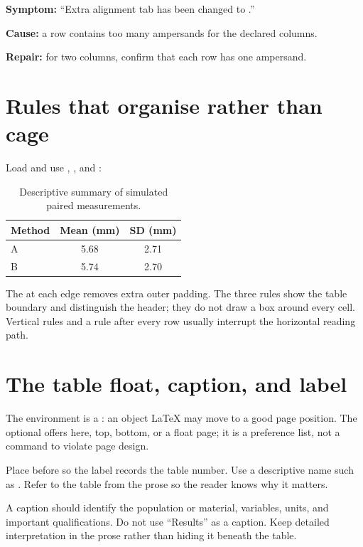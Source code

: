 \begin{commonerror}
\textbf{Symptom:} ``Extra alignment tab has been changed to .''

\textbf{Cause:} a row contains too many ampersands for the declared columns.

\textbf{Repair:} for two columns, confirm that each row has one ampersand.
\end{commonerror}

\section{Rules that organise rather than cage}

Load  and use , , and :

\begin{table}[htbp]
  \centering
  \caption{Descriptive summary of simulated paired measurements.}
  \label{tab:descriptive-summary}
  \begin{tabular}{@{}lSS@{}}
    \toprule
    {Method} & {Mean (mm)} & {SD (mm)} \\
    \midrule
    A & 5.68 & 2.71 \\
    B & 5.74 & 2.70 \\
    \bottomrule
  \end{tabular}
\end{table}

The  at each edge removes extra outer padding. The three rules
show the table boundary and distinguish the header; they do not draw a box
around every cell. Vertical rules and a rule after every row usually interrupt
the horizontal reading path.

\section{The table float, caption, and label}

The  environment is a : an object \LaTeX{} may move to a
good page position. The optional  offers here, top, bottom, or a
float page; it is a preference list, not a command to violate page design.

Place  before  so the label records the table number.
Use a descriptive name such as . Refer to the
table from the prose so the reader knows why it matters.

\begin{goodpractice}
A caption should identify the population or material, variables, units, and
important qualifications. Do not use ``Results'' as a caption. Keep detailed
interpretation in the prose rather than hiding it beneath the table.
\end{goodpractice}

